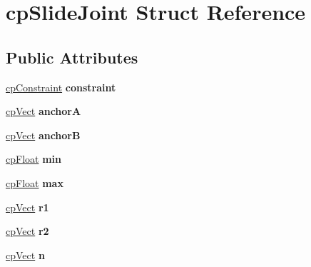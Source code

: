 \hypertarget{structcp_slide_joint}{}\section{cp\+Slide\+Joint Struct Reference}
\label{structcp_slide_joint}
\subsection*{Public Attributes}
\begin{DoxyCompactItemize}
\item 
\mbox{\label{structcp_slide_joint_ac176118fb1e3c608502e2c38b681299b}} 
\mbox{\hyperlink{structcp_constraint}{cp\+Constraint}} {\bfseries constraint}
\item 
\mbox{\label{structcp_slide_joint_ab4a47facc1b3b5159556acdb49da1f0c}} 
\mbox{\hyperlink{structcp_vect}{cp\+Vect}} {\bfseries anchorA}
\item 
\mbox{\label{structcp_slide_joint_a3b2651bb23758311d692f4c8723967bb}} 
\mbox{\hyperlink{structcp_vect}{cp\+Vect}} {\bfseries anchorB}
\item 
\mbox{\label{structcp_slide_joint_ab09e70408e21a6ec3876ec0bb8e0df3d}} 
\mbox{\hyperlink{group__basic_types_gac1ed65573e035bf892505768c852d8d3}{cp\+Float}} {\bfseries min}
\item 
\mbox{\label{structcp_slide_joint_a64e7a5318a380a89e4b2d4f415149a3e}} 
\mbox{\hyperlink{group__basic_types_gac1ed65573e035bf892505768c852d8d3}{cp\+Float}} {\bfseries max}
\item 
\mbox{\label{structcp_slide_joint_a0e9f6d561515fce715ed9e9b47a6ac18}} 
\mbox{\hyperlink{structcp_vect}{cp\+Vect}} {\bfseries r1}
\item 
\mbox{\label{structcp_slide_joint_a4ba25b2cbb8665e28aa2198df8b53f84}} 
\mbox{\hyperlink{structcp_vect}{cp\+Vect}} {\bfseries r2}
\item 
\mbox{\label{structcp_slide_joint_a984ebef2e99ef0e1e4bdb2d0b7aa3d50}} 
\mbox{\hyperlink{structcp_vect}{cp\+Vect}} {\bfseries n}

\end{DoxyCompactItemize}
